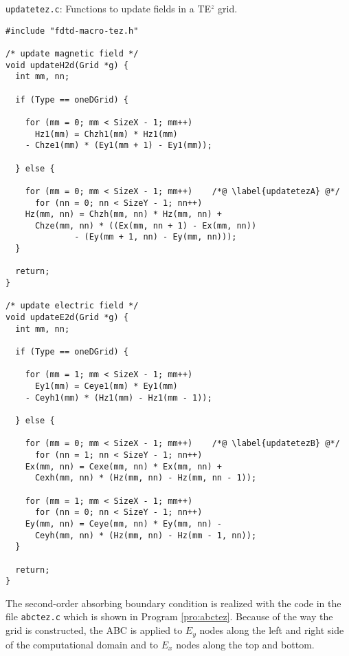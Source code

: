 \begin{program}
{\tt updatetez.c}: Functions to update fields in a TE$^z$ grid.
\label{pro:updatetez}
\codemiddle
\begin{lstlisting}
#include "fdtd-macro-tez.h"

/* update magnetic field */
void updateH2d(Grid *g) {
  int mm, nn;

  if (Type == oneDGrid) {

    for (mm = 0; mm < SizeX - 1; mm++)
      Hz1(mm) = Chzh1(mm) * Hz1(mm) 
	- Chze1(mm) * (Ey1(mm + 1) - Ey1(mm));

  } else { 

    for (mm = 0; mm < SizeX - 1; mm++)    /*@ \label{updatetezA} @*/
      for (nn = 0; nn < SizeY - 1; nn++)
	Hz(mm, nn) = Chzh(mm, nn) * Hz(mm, nn) +
	  Chze(mm, nn) * ((Ex(mm, nn + 1) - Ex(mm, nn))
			  - (Ey(mm + 1, nn) - Ey(mm, nn)));
  }

  return;
}

/* update electric field */
void updateE2d(Grid *g) {
  int mm, nn;

  if (Type == oneDGrid) {

    for (mm = 1; mm < SizeX - 1; mm++)
      Ey1(mm) = Ceye1(mm) * Ey1(mm) 
	- Ceyh1(mm) * (Hz1(mm) - Hz1(mm - 1));

  } else { 

    for (mm = 0; mm < SizeX - 1; mm++)    /*@ \label{updatetezB} @*/
      for (nn = 1; nn < SizeY - 1; nn++)
	Ex(mm, nn) = Cexe(mm, nn) * Ex(mm, nn) +
	  Cexh(mm, nn) * (Hz(mm, nn) - Hz(mm, nn - 1));

    for (mm = 1; mm < SizeX - 1; mm++)
      for (nn = 0; nn < SizeY - 1; nn++)
	Ey(mm, nn) = Ceye(mm, nn) * Ey(mm, nn) -
	  Ceyh(mm, nn) * (Hz(mm, nn) - Hz(mm - 1, nn));
  }

  return;
}
\end{lstlisting}
\end{program}

The second-order absorbing boundary condition is realized with the
code in the file {\tt abctez.c} which is shown in Program
\ref{pro:abctez}.  Because of the way the grid is constructed, the ABC
is applied to $E_y$ nodes along the left and right side of the
computational domain and to $E_x$ nodes along the top and bottom.

